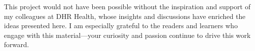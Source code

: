 %
%


This project would not have been possible without the inspiration and support of my colleagues at DHR Health, whose insights and discussions have enriched the ideas presented here. I am especially grateful to the readers and learners who engage with this material—your curiosity and passion continue to drive this work forward.